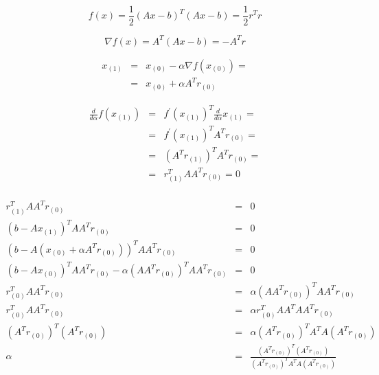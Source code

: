 \documentclass{article}
\begin{document}
\begin{equation}
f(x) = \frac{1}{2}\left( Ax -b \right)^{T} \left( Ax -b \right) = \frac{1}{2}r^Tr
\end{equation}

\begin{equation}
\nabla f(x) = A^{T}\left( Ax-b\right) = -A^T r
\end{equation}

\begin{eqnarray}
x_{(1)} &=& x_{(0)}  - \alpha \nabla f(x_{(0)}) = \\
&=& x_{(0)} + \alpha A^T r_{(0)}
\end{eqnarray}

\begin{eqnarray}
\frac{d}{d\alpha} f(x_{(1)}) &=& f^{\prime}(x_{(1)})^T \frac{d}{d\alpha} x_{(1)} = \\
&=& f^{\prime}(x_{(1)})^T A^T r_{(0)} = \\
&=& (A^T r_{(1)})^T A^T r_{(0)} = \\
&=&  r_{(1)}^T A A^T r_{(0)} = 0\\
\end{eqnarray}

\begin{eqnarray}
r_{(1)}^T A A^T r_{(0)} &=& 0 \nonumber \\
\left( b - A x_{(1)} \right)^T A A^T r_{(0)} &=& 0 \nonumber \\
\left( b - A \left( x_{(0)} + \alpha A^T r_{(0)} \right) \right)^T A A^T r_{(0)} &=& 0 \nonumber \\
\left( b - A x_{(0)} \right)^T A A^T r_{(0)} - \alpha \left(A A^T r_{(0)}\right)^T A A^T r_{(0)} &=& 0 \nonumber \\
r_{(0)}^T A A^T r_{(0)} &=& \alpha \left(A A^T r_{(0)}\right)^T A A^T r_{(0)} \nonumber  \\
r_{(0)}^T A A^T r_{(0)} &=& \alpha r_{(0)}^T A A^T A A^T r_{(0)} \nonumber \\
\left( A ^T r_{(0)}\right)^T \left(A^T r_{(0)}\right) &=& \alpha \left(A^T r_{(0)}\right)^T A^T A \left(A^T r_{(0)}\right) \nonumber \\
\alpha &=& \frac{\left( A ^T r_{(0)}\right)^T \left(A^T r_{(0)}\right) } {\left(A^T r_{(0)}\right)^T A^T A \left(A^T r_{(0)}\right)} \nonumber
\end{eqnarray}
\end{document}

